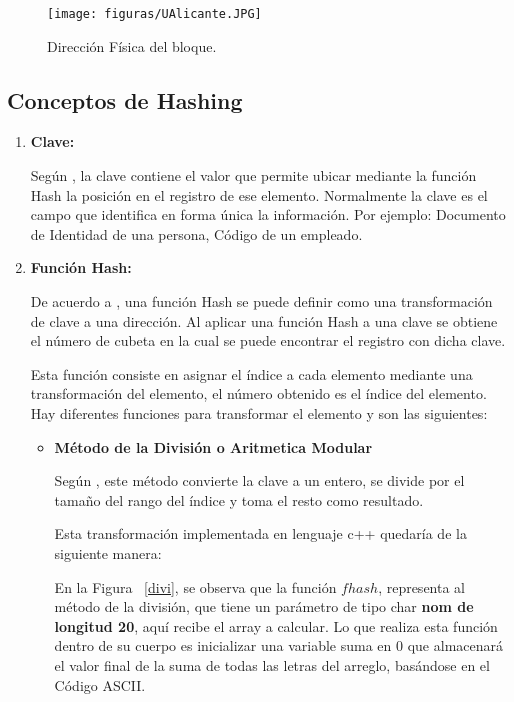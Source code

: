 \documentclass[10pt,conference]{IEEEtran}
\begin{document}
\begin{figure}[H]
 \begin{center}
       \texttt{[image: figuras/UAlicante.JPG]}
      \caption{Dirección Física del bloque.}
      \label{Ualicante} 
      \end{center}
\end{figure}


\subsection{\textbf{Conceptos de Hashing}}
\begin{enumerate}[]
    \item {\textbf{Clave:}}
    \par Según \citep{carrillo}, la clave contiene el valor que permite ubicar mediante la función Hash la posición en el registro de ese elemento. Normalmente la clave es el campo que identifica en forma única la información. Por ejemplo: Documento de Identidad de una persona, Código de un empleado.
    \item {\textbf{Función Hash:}}
    \par De acuerdo a \citep{cairo}, una  función Hash se puede definir como una transformación de clave a una dirección. Al aplicar una función Hash a una clave se obtiene el número de cubeta en la cual se puede encontrar el registro con dicha clave. 
    \par Esta función consiste en asignar el índice a cada elemento mediante una transformación del elemento, el número obtenido es el índice del elemento.
    Hay diferentes funciones para transformar el elemento y son las siguientes:
    \begin{itemize}
        \item {\textbf{Método de la División o Aritmetica Modular}}
        \par Según \citep{wiki}, este método convierte la clave a un entero, se divide por el tamaño del rango del índice y toma el resto como resultado.
        
        Esta transformación implementada en lenguaje c++ quedaría de la siguiente manera:
        
        En la Figura ~\ref{divi}, se observa que la función $fhash$, representa al método de la división, que tiene un parámetro de tipo char \textbf{nom de longitud 20}, aquí recibe el array a calcular. Lo que realiza esta función dentro de su cuerpo es inicializar una variable suma en $0$ que almacenará el valor final de la suma de todas las letras del arreglo, basándose en el Código ASCII.
        

\end{itemize}
\end{enumerate}
\end{document}
